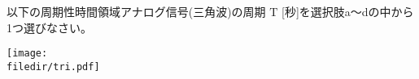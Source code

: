 以下の周期性時間領域アナログ信号(三角波)の周期 $\textrm{T}$ [秒]を選択肢a〜dの中から1つ選びなさい。

\centering\texttt{[image: \\filedir/tri.pdf]}
